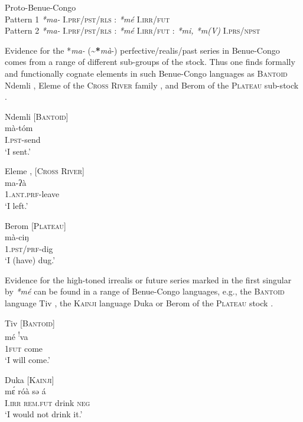 \documentclass[output=paper]{langsci/langscibook}
\begin{document}
\ea\label{ex:anderson:71}
 Proto-Benue-Congo\\
Pattern 1  \textit{*ma-} I.\textsc{prf/pst/rls  :}  \textit{*mé}  I.\textsc{irr/fut}\\  
Pattern 2  \textit{*ma-} I.\textsc{prf/pst/rls}  :  \textit{*mé} I.\textsc{irr/fut}  :   \textit{*mi, *m(V)} I.\textsc{prs/npst}\\
\z

Evidence for the *\textit{ma-} ({\textasciitilde}\textbf{*}\textit{mà}-) perfective/realis/past series in Benue-Congo  comes from a range of different sub-groups of the stock. Thus one finds formally and functionally cognate elements in such Benue-Congo languages as \textsc{Bantoid} Ndemli , Eleme of the \textsc{Cross River} family , and Berom of the \textsc{Plateau} sub-stock .

\ea\label{ex:anderson:72}
Ndemli   \citep[72]{Ngoran1999}            [\textsc{Bantoid}]\\
\gll mà-tóm \\
\textsc{I.pst-}send\\
\glt  `I sent.'   
\z

\ea\label{ex:anderson:73}
Eleme  \citep[1482]{Bond2008}, \citep{Bond2010}        [\textsc{Cross River]}\\
\gll ma-ʔà\\
1.\textsc{ant.prf}-leave\\
\glt `I left.'
\z

\ea\label{ex:anderson:74}
Berom  \citep[299, 301]{Bouquiaux1970}          [\textsc{Plateau}]\\
\gll mà-ciŋ\\
1.\textsc{pst/prf}-dig\\
\glt `I (have) dug.'
\z

Evidence for the high-toned irrealis or future series marked in the first singular by \textit{*mé} can be found in a range of Benue-Congo languages, e.g., the \textsc{Bantoid} language Tiv , the \textsc{Kainji} language Duka  or Berom of the \textsc{Plateau} stock .

\ea\label{ex:anderson:75}
 Tiv \citep[Tiv 4]{Arnott19671980}        \textsc{[Bantoid]}\\
 \gll mé    \textsuperscript{!}va\\
\textsc{1fut}  come\\
\glt `I will come.'
\z

\ea\label{ex:anderson:76}
Duka \citep[17]{BendorSamuelEtAl1973}      \textsc{[Kainji]}\\
\gll  m\'ɛ    róà    sə  á\\
I.\textsc{irr}  \textsc{rem.fut}  drink  \textsc{neg}\\
\glt `I would not drink it.'
\z
\end{document}
